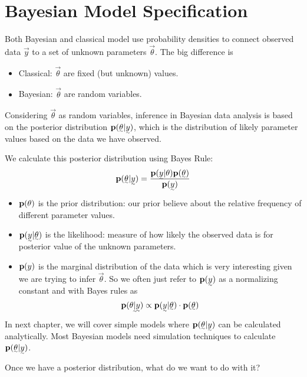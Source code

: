 \section{Bayesian Model Specification}

Both Bayesian and classical model use probability densities to connect observed data $\vec{y}$ to a set of unknown parameters $\vec{\theta}$. The big difference is 
\begin{itemize}
    \item Classical: $\vec{\theta}$ are fixed (but unknown) values.
    \item Bayesian: $\vec{\theta}$ are random variables.
\end{itemize}

Considering $\vec{\theta}$ as random variables, inference in Bayesian data analysis is based on the posterior distribution $\p(\vec{\theta} | \vec{y})$, which is the distribution of likely parameter values based on the data we have observed.

We calculate this posterior distribution using Bayes Rule:
\[
    \p(\vec{\theta}| \vec{y}) = \frac{\p(\vec{y}| \theta) \p(\vec{\theta})}{\p(\vec{y})}
\]

\begin{itemize}
    \item ${\mathbf p}(\theta)$ is the prior distribution: our prior believe about  the relative frequency of different parameter values.
    \item $\p(\vec{y}| \vec{\theta})$ is the likelihood: measure of how likely the observed data is for posterior value of the unknown parameters.
    \item ${\mathbf p}(y)$ is the marginal distribution of the data which is very interesting given we are trying to infer $\vec{\theta}$. So we often just refer to $\p(\vec{y})$ as a normalizing constant and with Bayes rules as
    \[
    \p(\vec{\theta| \vec{y}}) \propto \p(\vec{y}| \vec{\theta}) \cdot \p(\vec{\theta})
    \]
\end{itemize}

In next chapter, we will cover simple models where $\p(\vec{\theta}| \vec{y})$ can be calculated analytically. Most Bayesian models need simulation techniques to calculate $\p(\vec{\theta}| \vec{y})$.

Once we have a posterior distribution, what do we want to do with it?

